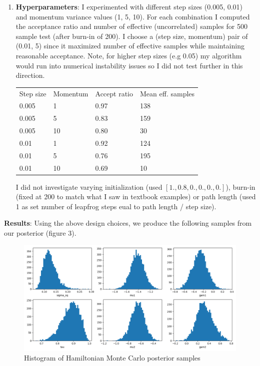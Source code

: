 \documentclass[12pt,letterpaper,twoside]{article}
\begin{document}
\begin{enumerate}[label=(\alph*)]
\item \textbf{Hyperparameters}: I experimented with different step 
sizes (0.005, 0.01) and momentum variance values (1, 5, 10). 
For each combination I computed the acceptance ratio and number of 
effective (uncorrelated) samples for 500 sample test (after 
burn-in of 200). I choose a (step size, momentum) pair of 
(0.01, 5) since it maximized number of effective samples while 
maintaining reasonable acceptance. Note, for higher step sizes 
(e.g 0.05) my algorithm would run into numerical instability issues 
so I did not test further in this direction.

\begin{table}[H]
    \centering
    \begin{tabular}{llll}
        Step size    & Momentum     & Accept ratio      & Mean eff. samples     \\
        0.005        & 1            & 0.97              & 138                   \\ 
        0.005        & 5            & 0.83              & 159                   \\
        0.005        & 10           & 0.80              & 30                    \\
        0.01         & 1            & 0.92              & 124                   \\
        0.01         & 5            & 0.76              & 195                   \\
        0.01         & 10           & 0.69              & 10                    \\    
    \end{tabular}
\end{table}

I did not investigate varying initialization (used $[1., 0.8, 0., 0., 0., 0.]$), 
burn-in (fixed at 200 to match what I saw in textbook examples) or path length
(used 1 as set number of leapfrog steps eual to path length / step size).
\end{enumerate}

\textbf{Results}: Using the above design choices, we produce the following 
samples from our posterior (figure 3).
\begin{figure}[H]
    \centering
    \includegraphics[scale=0.55]{hmc_sampled_histogram.png}
    \caption{Histogram of Hamiltonian Monte Carlo posterior samples}
\end{figure}
\end{document}
